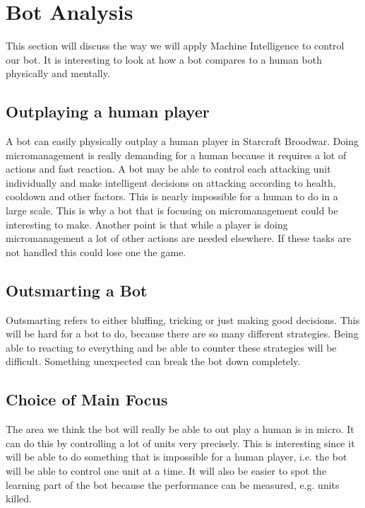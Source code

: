 \section{Bot Analysis}
	This section will discuss the way we will apply Machine Intelligence to control our bot. It is interesting to look at how a bot compares to a human both physically and mentally. 
	
	\subsection*{Outplaying a human player}
		A bot can easily physically outplay a human player in Starcraft Broodwar. 
		Doing micromanagement is really demanding for a human because it requires a lot of actions and fast reaction. A bot may be able to control each 
		attacking unit individually and make intelligent decisions on attacking according to health, cooldown and other factors. This is nearly impossible for a human to do in a large scale. This is why a bot that is focusing on micromanagement could be interesting to make. Another point 
		is that while a player is doing micromanagement a lot of other actions are needed elsewhere. If these tasks are not handled this could lose one the game.
		
	\subsection*{Outsmarting a Bot}
		Outsmarting refers to either bluffing, tricking or just making good decisions. This will be hard for a bot to do, because there are so many 
		different strategies. Being able to reacting to everything and be able to counter these strategies will be difficult. Something unexpected 
		can break the bot down completely.

\subsection{Choice of Main Focus}
	The area we think the bot will really be able to out play a human is in micro. It can do this by controlling a lot of units very precisely. This is interesting since it will be able to do something that is impossible for a human player, i.e. the bot will be able to control one unit at a time. It will also be easier to spot the learning part of the bot because the performance can be measured, e.g. units killed.